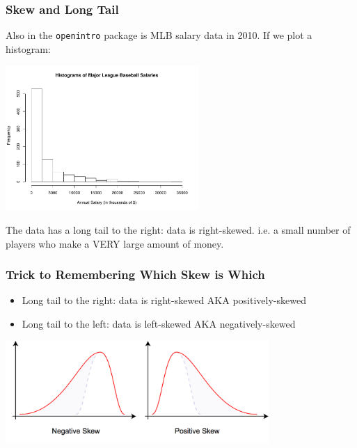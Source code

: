 \documentclass[handout]{beamer}
\newcommand{\blue}[1]{\textcolor{blue2}{#1}}
\begin{document}
\begin{frame}[fragile]
\frametitle{Skew and Long Tail}
Also in the {\tt openintro} package is MLB salary data in 2010.  If we plot a histogram:

\begin{center}
\includegraphics[height=5.5cm]{figure/MLB.pdf}
\end{center}

\pause The data has a \blue{long tail} to the right: data is \blue{right-skewed}.  i.e. a small number of players who make a VERY large amount of money.  

\end{frame}



\begin{frame}[fragile]
\frametitle{Trick to Remembering Which Skew is Which}

\begin{itemize}
\item Long tail to the right: data is \blue{right-skewed} AKA \blue{positively-skewed}
\item Long tail to the left: data is \blue{left-skewed} AKA \blue{negatively-skewed}
\end{itemize}

\begin{center}
\pause\includegraphics[width=10cm]{figure/skew.png}
\end{center}


\end{frame}
\end{document}
